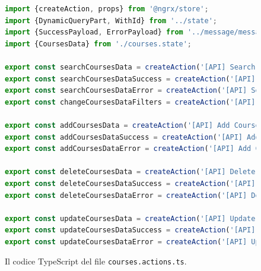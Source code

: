 \begin{figure}[H]
\centering
\begin{lstlisting}[language=TypeScript, linewidth=20cm, basicstyle=\tiny]
import {createAction, props} from '@ngrx/store';
import {DynamicQueryPart, WithId} from '../state';
import {SuccessPayload, ErrorPayload} from '../message/message.actions';
import {CoursesData} from './courses.state';

export const searchCoursesData = createAction('[API] Search Courses Data', props<{queryParams: DynamicQueryPart} & WithId>());
export const searchCoursesDataSuccess = createAction('[API] Search Courses Data Success', props<SuccessPayload<{result: CoursesData[]}> & WithId>());
export const searchCoursesDataError = createAction('[API] Search Courses Data Error', props<ErrorPayload & WithId>());
export const changeCoursesDataFilters = createAction('[API] Change Courses Data Filters', props<{queryParams: DynamicQueryPart} & WithId>());

export const addCoursesData = createAction('[API] Add Courses Data', props<{item: Partial<CoursesData>} & WithId>());
export const addCoursesDataSuccess = createAction('[API] Add Courses Data Success', props<SuccessPayload<{result: CoursesData[]}> & WithId>());
export const addCoursesDataError = createAction('[API] Add Courses Data Error', props<ErrorPayload & WithId>());

export const deleteCoursesData = createAction('[API] Delete Courses Data', props<{item: Partial<CoursesData>} & WithId>());
export const deleteCoursesDataSuccess = createAction('[API] Delete Courses Data Success', props<SuccessPayload<{result: CoursesData[]}> & WithId>());
export const deleteCoursesDataError = createAction('[API] Delete Courses Data Error', props<ErrorPayload & WithId>());

export const updateCoursesData = createAction('[API] Update Courses Data', props<{ item: Partial<CoursesData> } & WithId>());
export const updateCoursesDataSuccess = createAction('[API] Update Courses Data Success', props<SuccessPayload<{result: CoursesData[]}> & WithId>());
export const updateCoursesDataError = createAction('[API] Update Courses Data Error', props<ErrorPayload & WithId>());
\end{lstlisting}
\caption{\label{fig:courses.actions}Il codice TypeScript del file \texttt{courses.actions.ts}.}
\end{figure}

